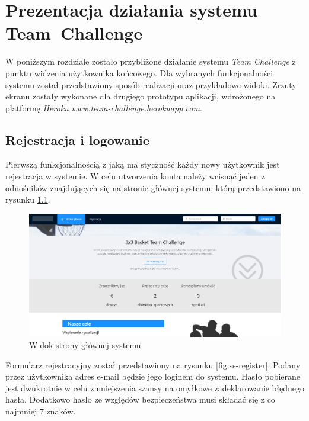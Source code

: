 \chapter{Prezentacja działania systemu Team~Challenge}

W poniższym rozdziale zostało przybliżone działanie systemu \textit{Team Challenge} z punktu widzenia użytkownika końcowego. Dla wybranych funkcjonalności systemu został przedstawiony sposób realizacji oraz przykładowe widoki. Zrzuty ekranu zostały wykonane dla drugiego prototypu aplikacji, wdrożonego na platformę \textit{Heroku} \textit{www.team-challenge.herokuapp.com}.   

\section{Rejestracja i logowanie}

Pierwszą funkcjonalnością z jaką ma styczność każdy nowy użytkownik jest rejestracja w systemie. W celu utworzenia konta należy wcisnąć jeden z odnośników znajdujących się na stronie głównej systemu, którą przedstawiono na rysunku \ref{fig:ss-landing}.

\begin{figure}[H]
\centering
\includegraphics[width=\linewidth]{065-dzialanie/rys/ss-landing.PNG}
\caption{Widok strony głównej systemu}
\label{fig:ss-landing}
\end{figure}

Formularz rejestracyjny został przedstawiony na rysunku \ref{fig:ss-register}. Podany przez użytkownika adres e-mail będzie jego loginem do systemu. Hasło pobierane jest dwukrotnie w celu zmniejszenia szansy na omyłkowe zadeklarowanie błędnego hasła. Dodatkowo hasło ze względów bezpieczeństwa musi składać się z co najmniej 7 znaków.   


